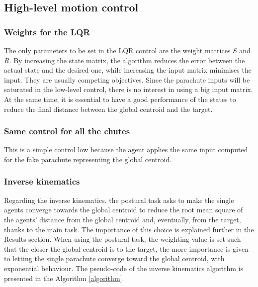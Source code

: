 \subsection{High-level motion control}\label{sec:details_high_level}
\subsubsection{Weights for the LQR}
The only parameters to be set in the LQR control are the weight matrices $S$ and $R$. By increasing the state matrix, the algorithm reduces the error between the actual state and the desired one, while increasing the input matrix minimises the input. They are usually competing objectives. Since the parachute inputs will be saturated in the low-level control, there is no interest in using a big input matrix. At the same time, it is essential to have a good performance of the states to reduce the final distance between the global centroid and the target.
\subsubsection{Same control for all the chutes}
This is a simple control low because the agent applies the same input computed for the fake parachute representing the global centroid.
\subsubsection{Inverse kinematics}
 Regarding the inverse kinematics, the postural task asks to make the single agents converge towards the global centroid to reduce the root mean square of the agents' distance from the global centroid and, eventually, from the target, thanks to the main task. The importance of this choice is explained further in the Results section. When using the postural task, the weighting value is set such that the closer the global centroid is to the target, the more importance is given to letting the single parachute converge toward the global centroid, with exponential behaviour. The pseudo-code of the inverse kinematics algorithm is presented in the Algorithm \ref{algorithm}.

